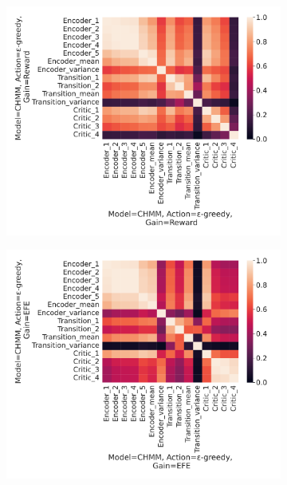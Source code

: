 \documentclass[twoside,11pt]{article}
\begin{document}
\begin{figure}[H]
    \centering
    \begin{subfigure}{.3\textwidth}
        \centering
        \includegraphics[draft=false,width=\linewidth]{cka_figures/CKA_chmm_73_chmm_73}
        \caption{}\label{sfig:cka-chmm-chmm}
    \end{subfigure}%
    \begin{subfigure}{.3\textwidth}
        \centering
        \includegraphics[draft=false,width=\linewidth]{cka_figures/CKA_chmm_77_chmm_77}
        \caption{}\label{sfig:cka-chmm2-chmm2}

\end{subfigure}
\end{figure}
\end{document}
